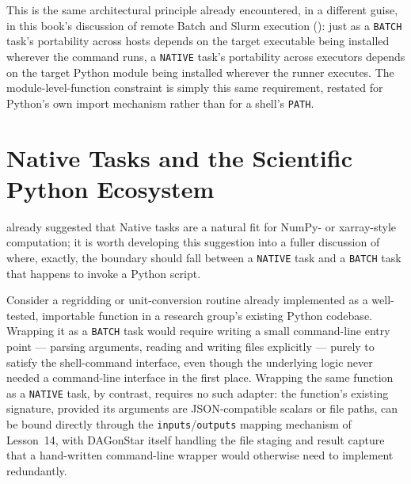 \begin{practicebox}
This is the same architectural principle already encountered, in a
different guise, in this book's discussion of remote Batch and Slurm
execution (): just as a \texttt{BATCH} task's portability
across hosts depends on the target executable being installed wherever the
command runs, a \texttt{NATIVE} task's portability across executors depends
on the target Python module being installed wherever the runner executes.
The module-level-function constraint is simply this same requirement,
restated for Python's own import mechanism rather than for a shell's
\texttt{PATH}.
\end{practicebox}

\section{Native Tasks and the Scientific Python Ecosystem}

 already suggested that Native tasks are a natural fit
for NumPy- or xarray-style computation; it is worth developing this
suggestion into a fuller discussion of where, exactly, the boundary should
fall between a \texttt{NATIVE} task and a \texttt{BATCH} task that happens
to invoke a Python script.

Consider a regridding or unit-conversion routine already implemented as a
well-tested, importable function in a research group's existing Python
codebase. Wrapping it as a \texttt{BATCH} task would require writing a
small command-line entry point --- parsing arguments, reading and writing
files explicitly --- purely to satisfy the shell-command interface, even
though the underlying logic never needed a command-line interface in the
first place. Wrapping the same function as a \texttt{NATIVE} task, by
contrast, requires no such adapter: the function's existing signature,
provided its arguments are JSON-compatible scalars or file paths, can be
bound directly through the \texttt{inputs}/\texttt{outputs} mapping
mechanism of Lesson~14, with DAGonStar itself handling the file staging and
result capture that a hand-written command-line wrapper would otherwise
need to implement redundantly.

